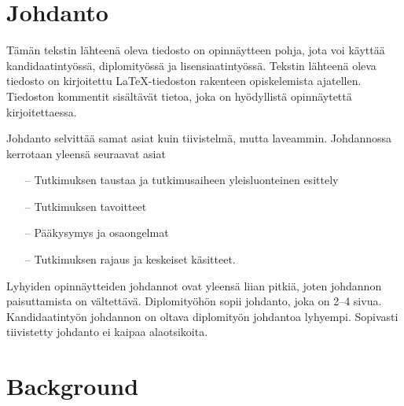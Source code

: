 \documentclass[english,12pt,a4paper,pdftex,sci,utf8]{aaltothesis}
\begin{document}
\section{Johdanto}

\thispagestyle{empty}

T\"am\"an tekstin l\"ahteen\"a oleva tiedosto on opinn\"aytteen
pohja, jota voi k\"aytt\"a\"a kandidaatinty\"oss\"a, diplomity\"oss\"a ja
lisensiaatinty\"oss\"a. Tekstin
l\"ahteen\"a oleva tiedosto on kirjoitettu  \LaTeX-tiedoston rakenteen
opiskelemista ajatellen. Tiedoston kommentit sis\"alt\"av\"at
tietoa, joka on hy\"odyllist\"a opinn\"aytett\"a kirjoitettaessa.

Johdanto selvitt\"a\"a samat asiat kuin tiivistelm\"a, mutta
laveammin. Johdannossa kerrotaan yleens\"a seuraavat asiat

\begin{itemize}
\item[--]Tutkimuksen taustaa ja tutkimusaiheen yleisluonteinen esittely
\item[--]Tutkimuksen tavoitteet
\item[--]P\"a\"akysymys ja osaongelmat
\item[--]Tutkimuksen rajaus ja keskeiset k\"asitteet.
\end{itemize}

Lyhyiden opinn\"aytteiden johdannot ovat yleens\"a liian pitki\"a, joten
johdannon paisuttamista on v\"altett\"av\"a. Diplomity\"oh\"on sopii johdanto,
joka on 2--4 sivua. %
Kandidaatinty\"on johdannon on oltava diplomity\"on
johdantoa lyhyempi. Sopivasti tiivistetty johdanto ei kaipaa alaotsikoita.


\clearpage

\section{Background}
\end{document}

